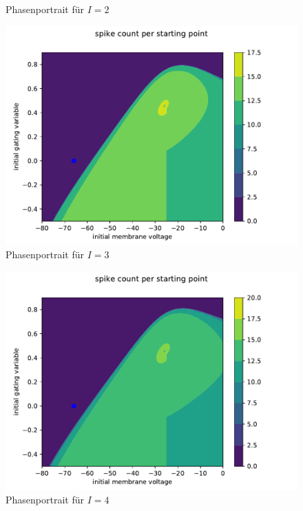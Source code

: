\documentclass[12pt,a4paper]{article}
\begin{document}
\begin{figure}[H]
\caption{Phasenportrait für $I=2$}
\label{pp2}
\end{figure}\begin{figure}[H]
\centering
\includegraphics[scale=0.9]{contourneu3neu.pdf} 
\caption{Phasenportrait für $I=3$}
\label{pp3}
\end{figure}\begin{figure}[H]
\centering
\includegraphics[scale=0.9]{contourneu4neu.pdf} 
\caption{Phasenportrait für $I=4$}
\label{pp4}
\end{figure}\begin{figure}[H]
\centering

\end{figure}
\end{document}
